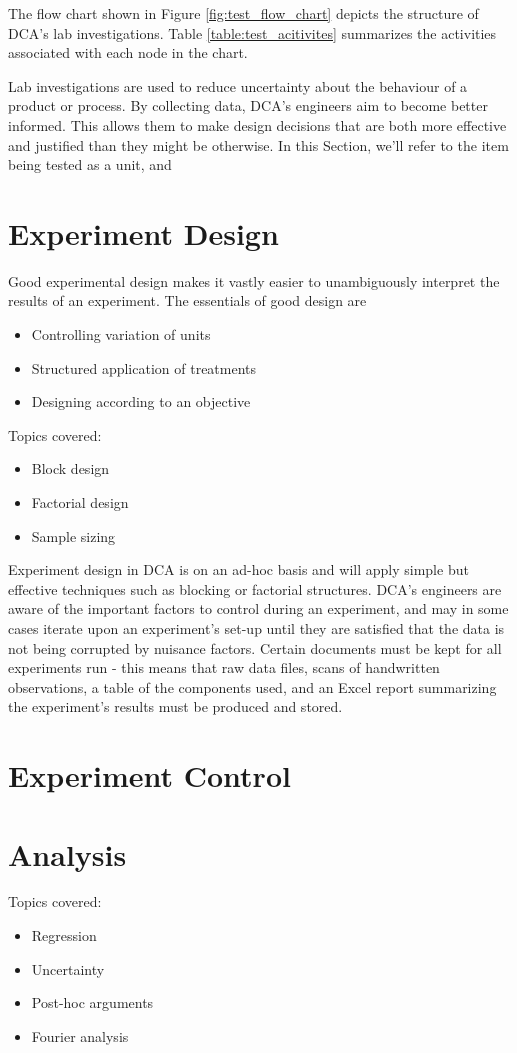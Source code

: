 \documentclass[11pt,a4paper,article]{memoir} %
\begin{document}
\par
The flow chart shown in Figure \ref{fig:test_flow_chart} depicts the structure of DCA's lab investigations. Table \ref{table:test_acitivites} summarizes the activities associated with each node in the chart.
\par
Lab investigations are used to reduce uncertainty about the behaviour of a product or process. By collecting data, DCA's engineers aim to become better informed. This allows them to make design decisions that are both more effective and justified than they might be otherwise. In this Section, we'll refer to the item being tested as a unit, and 

\section{Experiment Design}
Good experimental design makes it vastly easier to unambiguously interpret the results of an experiment. The essentials of good design are
\begin{itemize}
\item Controlling variation of units
\item Structured application of treatments
\item Designing according to an objective
\end{itemize}
Topics covered:
\begin{itemize}
\item Block design
\item Factorial design
\item Sample sizing
\end{itemize}

Experiment design in DCA is on an ad-hoc basis and will apply simple but effective techniques such as blocking or factorial structures. DCA's engineers are aware of the important factors to control during an experiment, and may in some cases iterate upon an experiment's set-up until they are satisfied that the data is not being corrupted by nuisance factors.
Certain documents must be kept for all experiments run - this means that raw data files, scans of handwritten observations, a table of the components used, and an Excel report summarizing the experiment's results must be produced and stored.

\section{Experiment Control}

\section{Analysis}
Topics covered:
\begin{itemize}
\item Regression
\item Uncertainty
\item Post-hoc arguments
\item Fourier analysis
\end{itemize}
\end{document}
